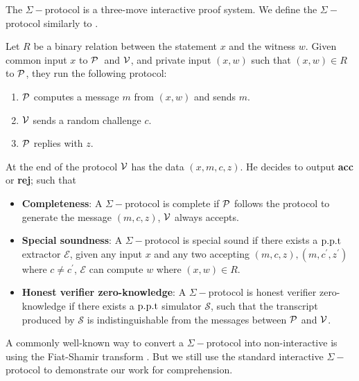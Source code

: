 The $\Sigma-$protocol is a three-move interactive proof system. We define the $\Sigma-$protocol similarly to \cite{damgard10}.
\begin{definition} 
\label{sec:sigma}
Let $R$ be a binary relation between the statement $x$ and the witness $w$. Given common input $x$ to $\mathcal{P}$\ and $\mathcal{V}$, and private input $(x,w)$ such that $(x,w)\in{R}$ to $\mathcal{P}$, they run the following protocol:
\begin{enumerate}
    \item $\mathcal{P}$ computes a message $m$ from $(x,w)$ and sends $m$.
    \item $\mathcal{V}$ sends a random challenge $c$.
    \item $\mathcal{P}$ replies with $z$.
\end{enumerate}
At the end of the protocol $\mathcal{V}$ has the data $(x,m,c,z)$. He decides to output \textbf{acc} or \textbf{rej}; such that
\begin{itemize}
    \item \textbf{Completeness}: A $\Sigma-$protocol is complete if $\mathcal{P}$ follows the protocol to generate the message $(m,c,z)$, $\mathcal{V}$ always accepts.
    \item \textbf{Special soundness}: A $\Sigma-$protocol is special sound if there exists a $\text{p.p.t}$ extractor $\mathcal{E}$, given any input $x$ and any two accepting $(m,c,z),(m,c^\prime,z^\prime)$ where $c\ne{c^\prime}$, $\mathcal{E}$ can compute $w$ where $(x,w)\in{R}$.
    \item \textbf{Honest verifier zero-knowledge}: A $\Sigma-$protocol is honest verifier zero-knowledge if there exists a $\text{p.p.t}$ simulator $\mathcal{S}$, such that the transcript produced by $\mathcal{S}$ is indistinguishable from the messages between $\mathcal{P}$ and $\mathcal{V}$.
\end{itemize}
\end{definition}
A commonly well-known way to convert a $\Sigma-$protocol into non-interactive is using the Fiat-Shamir transform \cite{fs}. But we still use the standard interactive $\Sigma-$protocol to demonstrate our work for comprehension.

